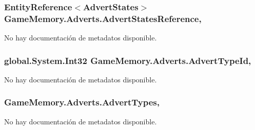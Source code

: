 \hypertarget{class_game_memory_1_1_adverts_a5238fd71f38608ac56eb5eac5e0fe270}{
\subsubsection[{Advert\-States\-Reference}]{\setlength{\rightskip}{0pt plus 5cm}Entity\-Reference$<${\bf Advert\-States}$>$ Game\-Memory.\-Adverts.\-Advert\-States\-Reference\hspace{0.3cm}{\ttfamily [get]}, {\ttfamily [set]}}}\label{class_game_memory_1_1_adverts_a5238fd71f38608ac56eb5eac5e0fe270}


No hay documentación de metadatos disponible. 

\hypertarget{class_game_memory_1_1_adverts_a8c76ff553e2ab7355a2a470325146cff}{
\subsubsection[{Advert\-Type\-Id}]{\setlength{\rightskip}{0pt plus 5cm}global.\-System.\-Int32 Game\-Memory.\-Adverts.\-Advert\-Type\-Id\hspace{0.3cm}{\ttfamily [get]}, {\ttfamily [set]}}}\label{class_game_memory_1_1_adverts_a8c76ff553e2ab7355a2a470325146cff}


No hay documentación de metadatos disponible. 

\hypertarget{class_game_memory_1_1_adverts_a430fdeb87c0491d6a0c52aa2ce601673}{
\subsubsection[{Advert\-Types}]{ Game\-Memory.\-Adverts.\-Advert\-Types\hspace{0.3cm}{\ttfamily [get]}, {\ttfamily [set]}}}\label{class_game_memory_1_1_adverts_a430fdeb87c0491d6a0c52aa2ce601673}


No hay documentación de metadatos disponible. 

